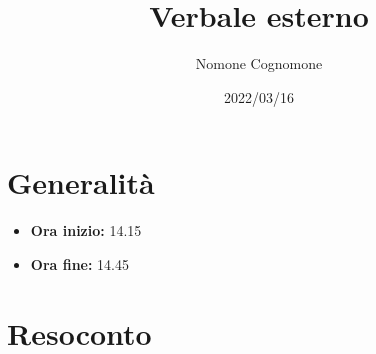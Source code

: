 \documentclass{classes/base}
\title{Verbale esterno}
\date{2022/03/16}
\author{Nomone Cognomone}
\renewcommand{\maketitle}{
    
}
\begin{document}
    \maketitle

    \section{Generalità}
    \begin{itemize}
        \item \textbf{Ora inizio:} 14.15
        \item \textbf{Ora fine:} 14.45
    \end{itemize}

    \section{Resoconto}
\end{document}
